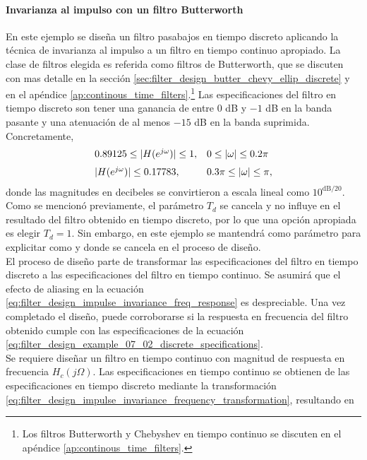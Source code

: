 \documentclass[a4paper]{report}
\begin{document}
\paragraph{Invarianza al impulso con un filtro Butterworth} En este ejemplo se diseña un filtro pasabajos en tiempo discreto aplicando la técnica de invarianza al impulso a un filtro en tiempo continuo apropiado. La clase de filtros elegida es referida como filtros de Butterworth, que se discuten con mas detalle en la sección \ref{sec:filter_design_butter_chevy_ellip_discrete} y en el apéndice \ref{ap:continous_time_filters}.\footnote{Los filtros Butterworth y Chebyshev en tiempo continuo se discuten en el apéndice \ref{ap:continous_time_filters}.} Las especificaciones del filtro en tiempo discreto son tener una ganancia de entre 0 dB y \(-1\) dB en la banda pasante y una atenuación de al menos \(-15\) dB en la banda suprimida. Concretamente,
\begin{equation}\label{eq:filter_design_example_07_02_discrete_specifications}
 \begin{array}{ll}
  0.89125\leq|H(e^{j\omega})|\leq1, & 0\leq|\omega|\leq0.2\pi\\[\medskipamount]
  |H(e^{j\omega})|\leq0.17783, & 0.3\pi\leq|\omega|\leq\pi,
 \end{array} 
\end{equation}
donde las magnitudes en decibeles se convirtieron a escala lineal como \(10^{\textrm{dB}/20}\). Como se mencionó previamente, el parámetro \(T_d\) se cancela y no influye en el resultado del filtro obtenido en tiempo discreto, por lo que una opción apropiada es elegir \(T_d=1\). Sin embargo, en este ejemplo se mantendrá como parámetro para explicitar como y donde se cancela en el proceso de diseño.
\\
El proceso de diseño parte de transformar las especificaciones del filtro en tiempo discreto a las especificaciones del filtro en tiempo continuo. Se asumirá que el efecto de aliasing en la ecuación \ref{eq:filter_design_impulse_invariance_freq_response} es despreciable. Una vez completado el diseño, puede corroborarse si la respuesta en frecuencia del filtro obtenido cumple con las especificaciones de la ecuación \ref{eq:filter_design_example_07_02_discrete_specifications}.
\\
Se requiere diseñar un filtro en tiempo continuo con magnitud de respuesta en frecuencia \(H_c(j\Omega)\). Las especificaciones en tiempo continuo se obtienen de las especificaciones en tiempo discreto mediante la transformación \ref{eq:filter_design_impulse_invariance_frequency_transformation}, resultando en
\end{document}
